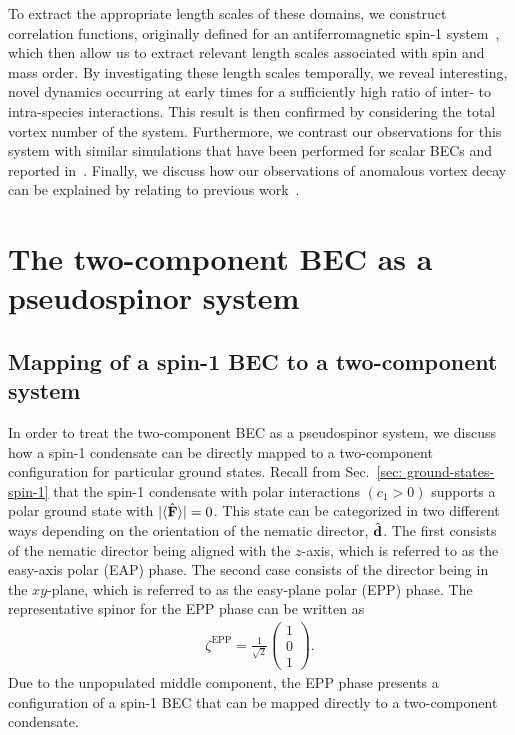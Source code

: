 To extract the appropriate length scales of these domains, we construct
correlation functions, originally defined for an antiferromagnetic spin-1
system~\cite{Symes2017}, which then allow us to extract relevant length scales
associated with spin and mass order.
By investigating these length scales temporally, we reveal interesting,
novel dynamics occurring at early times for a sufficiently high ratio of
inter- to intra-species interactions.
This result is then confirmed by considering the total vortex number of the
system.
Furthermore, we contrast our observations for this system with similar
simulations that have been performed for scalar BECs and reported
in~\cite{Schole2012, Nowak2012, Karl2017}.
Finally, we discuss how our observations of anomalous vortex decay can be
explained by relating to previous work~\cite{Eto2011, Kasamatsu2016}.

\section{The two-component BEC as a pseudospinor system}
\subsection{Mapping of a spin-1 BEC to a two-component system}
In order to treat the two-component BEC as a pseudospinor system, we discuss
how a spin-1 condensate can be directly mapped to a two-component configuration
for particular ground states.
Recall from Sec.~\ref{sec: ground-states-spin-1} that the spin-1 condensate
with polar interactions \((c_1 > 0)\) supports a polar ground state with
\(|\langle \hat{\vb{F}} \rangle |=0\).
This state can be categorized in two different ways depending on the orientation
of the nematic director, \(\hat{\vb{d}}\).
The first consists of the nematic director being aligned with the \( z \)-axis,
which is referred to as the easy-axis polar (EAP) phase.
The second case consists of the director being in the \( xy \)-plane, which is
referred to as the easy-plane polar (EPP) phase.
The representative spinor for the EPP phase can be written as
\begin{align}\label{eq: EPP-spinor}
    \zeta^\text{EPP} = \frac{1}{\sqrt{2}}\begin{pmatrix}
        1 \\ 0 \\ 1
    \end{pmatrix}.
\end{align}
Due to the unpopulated middle component, the EPP phase presents a configuration
of a spin-1 BEC that can be mapped directly to a two-component condensate.

